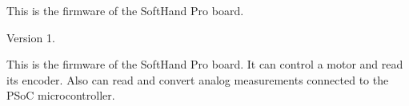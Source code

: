 This is the firmware of the Soft\+Hand Pro board. \begin{DoxyVersion}{Version}
1.
\end{DoxyVersion}
This is the firmware of the Soft\+Hand Pro board. It can control a motor and read its encoder. Also can read and convert analog measurements connected to the P\+SoC microcontroller. 